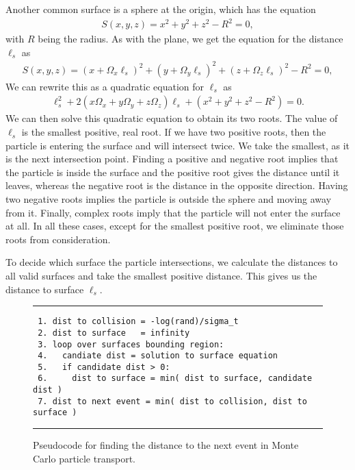 Another common surface is a sphere at the origin, which has the equation
\begin{align}
  S(x,y,z) = x^2 + y^2 + z^2 - R^2 = 0,
\end{align}
with $R$ being the radius. As with the plane, we get the equation for the distance $\ell_s$ as
\begin{align}
  S(x,y,z) = ( x + \Omega_x \ell_s )^2 + ( y + \Omega_y \ell_s )^2 + ( z + \Omega_z \ell_s )^2 - R^2 = 0,
\end{align}
We can rewrite this as a quadratic equation for $\ell_s$ as
\begin{align}
  \ell_s^2 + 2 ( x \Omega_x + y \Omega_y + z \Omega_z  ) \ell_s +  \left( x^2 + y^2 + z^2  - R^2 \right) = 0 .
\end{align}
We can then solve this quadratic equation to obtain its two roots. The value of $\ell_s$ is the smallest positive, real root. If we have two positive roots, then the particle is entering the surface and will intersect twice. We take the smallest, as it is the next intersection point. Finding a positive and negative root implies that the particle is inside the surface and the positive root gives the distance until it leaves, whereas the negative root is the distance in the opposite direction. Having two negative roots implies the particle is outside the sphere and moving away from it. Finally, complex roots imply that the particle will not enter the surface at all. In all these cases, except for the smallest positive root, we eliminate those roots from consideration.

To decide which surface the particle intersections, we calculate the distances to all valid surfaces and take the smallest positive distance. This gives us the distance to surface $\ell_s$.

\begin{figure}[tb!]
\begin{center}
\noindent \rule{\textwidth}{1pt}
\begin{verbatim}
 1. dist to collision = -log(rand)/sigma_t
 2. dist to surface   = infinity
 3. loop over surfaces bounding region:
 4.   candiate dist = solution to surface equation
 5.   if candidate dist > 0:
 6.     dist to surface = min( dist to surface, candidate dist )
 7. dist to next event = min( dist to collision, dist to surface )
\end{verbatim}
\rule{\textwidth}{1pt}
\caption{Pseudocode for finding the distance to the next event in Monte Carlo particle transport.}
\label{Fig:probability_monteCarloTransportTrackingAlgorithm}
\end{center}
\end{figure}



